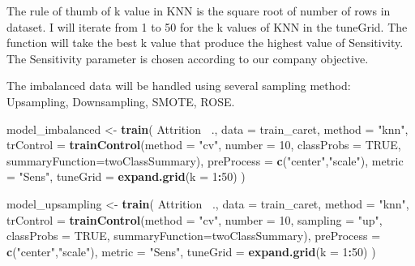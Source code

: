 \documentclass[
]{article}
\newenvironment{Shaded}{\begin{snugshade}}{\end{snugshade}}
\newcommand{\DataTypeTok}[1]{\textcolor[rgb]{0.13,0.29,0.53}{#1}}
\newcommand{\DecValTok}[1]{\textcolor[rgb]{0.00,0.00,0.81}{#1}}
\newcommand{\KeywordTok}[1]{\textcolor[rgb]{0.13,0.29,0.53}{\textbf{#1}}}
\newcommand{\NormalTok}[1]{#1}
\newcommand{\OperatorTok}[1]{\textcolor[rgb]{0.81,0.36,0.00}{\textbf{#1}}}
\newcommand{\OtherTok}[1]{\textcolor[rgb]{0.56,0.35,0.01}{#1}}
\newcommand{\StringTok}[1]{\textcolor[rgb]{0.31,0.60,0.02}{#1}}
\begin{document}
The rule of thumb of k value in KNN is the square root of number of rows
in dataset. I will iterate from 1 to 50 for the k values of KNN in the
tuneGrid. The function will take the best k value that produce the
highest value of Sensitivity. The Sensitivity parameter is chosen
according to our company objective.

The imbalanced data will be handled using several sampling method:
Upsampling, Downsampling, SMOTE, ROSE.

\begin{Shaded}
\begin{Highlighting}[]
\NormalTok{model_imbalanced <-}\StringTok{ }\KeywordTok{train}\NormalTok{(}
\NormalTok{  Attrition }\OperatorTok{~}\NormalTok{., }\DataTypeTok{data =}\NormalTok{ train_caret, }\DataTypeTok{method =} \StringTok{"knn"}\NormalTok{,}
  \DataTypeTok{trControl =} \KeywordTok{trainControl}\NormalTok{(}\DataTypeTok{method =} \StringTok{"cv"}\NormalTok{,}
                           \DataTypeTok{number =} \DecValTok{10}\NormalTok{,}
                           \DataTypeTok{classProbs =} \OtherTok{TRUE}\NormalTok{,}
                           \DataTypeTok{summaryFunction=}\NormalTok{twoClassSummary),}
  \DataTypeTok{preProcess =} \KeywordTok{c}\NormalTok{(}\StringTok{"center"}\NormalTok{,}\StringTok{"scale"}\NormalTok{),}
  \DataTypeTok{metric =} \StringTok{"Sens"}\NormalTok{,}
  \DataTypeTok{tuneGrid =} \KeywordTok{expand.grid}\NormalTok{(}\DataTypeTok{k =} \DecValTok{1}\OperatorTok{:}\DecValTok{50}\NormalTok{)}
\NormalTok{  )}

\NormalTok{model_upsampling <-}\StringTok{ }\KeywordTok{train}\NormalTok{(}
\NormalTok{  Attrition }\OperatorTok{~}\NormalTok{., }\DataTypeTok{data =}\NormalTok{ train_caret, }\DataTypeTok{method =} \StringTok{"knn"}\NormalTok{,}
  \DataTypeTok{trControl =} \KeywordTok{trainControl}\NormalTok{(}\DataTypeTok{method =} \StringTok{"cv"}\NormalTok{,}
                           \DataTypeTok{number =} \DecValTok{10}\NormalTok{,}
                           \DataTypeTok{sampling =} \StringTok{"up"}\NormalTok{,}
                           \DataTypeTok{classProbs =} \OtherTok{TRUE}\NormalTok{,}
                           \DataTypeTok{summaryFunction=}\NormalTok{twoClassSummary),}
  \DataTypeTok{preProcess =} \KeywordTok{c}\NormalTok{(}\StringTok{"center"}\NormalTok{,}\StringTok{"scale"}\NormalTok{),}
  \DataTypeTok{metric =} \StringTok{"Sens"}\NormalTok{,}
  \DataTypeTok{tuneGrid =} \KeywordTok{expand.grid}\NormalTok{(}\DataTypeTok{k =} \DecValTok{1}\OperatorTok{:}\DecValTok{50}\NormalTok{)}
\NormalTok{  )}


\end{Highlighting}
\end{Shaded}
\end{document}
